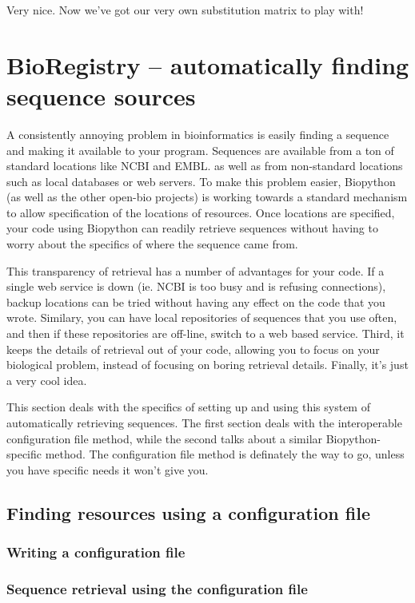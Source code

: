 \documentclass{report}
\begin{document}
Very nice. Now we've got our very own substitution matrix to play with!

\section{BioRegistry -- automatically finding sequence sources}

A consistently annoying problem in bioinformatics is easily finding a
sequence and making it available to your program. Sequences are
available from a ton of standard locations like NCBI and EMBL. as well
as from non-standard locations such as local databases or web servers.
To make this problem easier, Biopython (as well as the other open-bio
projects) is working towards a standard mechanism to allow specification
of the locations of resources. Once locations are specified, your code
using Biopython can readily retrieve sequences without having to worry
about the specifics of where the sequence came from.

This transparency of retrieval has a number of advantages for your code.
If a single web service is down (ie. NCBI is too busy
and is refusing connections), backup locations can be tried without
having any effect on the code that you wrote. Similary, you can have
local repositories of sequences that you use often, and then if these
repositories are off-line, switch to a web based service. Third, it
keeps the details of retrieval out of your code, allowing you to focus
on your biological problem, instead of focusing on boring retrieval
details. Finally, it's just a very cool idea.

This section deals with the specifics of setting up and using this
system of automatically retrieving sequences. The first section deals
with the interoperable configuration file method, while the second talks
about a similar Biopython-specific method. The configuration file method
is definately the way to go, unless you have specific needs it won't
give you.

\subsection{Finding resources using a configuration file}

\subsubsection{Writing a configuration file}

\subsubsection{Sequence retrieval using the configuration file}
\end{document}
